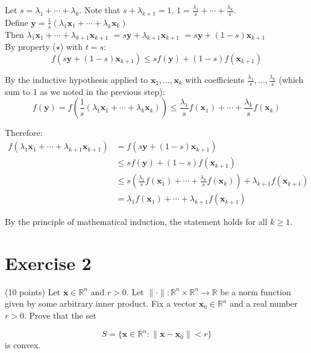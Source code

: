 \documentclass{article}
\begin{document}
Let $s = \lambda_1 + \cdots + \lambda_k$. Note that $s + \lambda_{k+1} = 1$, $1 = \frac{\lambda_1}{s} + \cdots + \frac{\lambda_{k}}{s}$. \\

Define $\mathbf{y} = \frac{1}{s}(\lambda_1\mathbf{x}_1 + \cdots + \lambda_k\mathbf{x}_k)$ \\

Then $\lambda_1\mathbf{x}_1 + \cdots + \lambda_{k+1}\mathbf{x}_{k+1}$ 
$= s\mathbf{y} + \lambda_{k+1}\mathbf{x}_{k+1}$
$= s\mathbf{y} + (1-s)\mathbf{x}_{k+1}$ \\

By property ($\star$) with $t = s$:
$$f(s\mathbf{y} + (1-s)\mathbf{x}_{k+1}) \leq sf(\mathbf{y}) + (1-s)f(\mathbf{x}_{k+1})$$

By the inductive hypothesis applied to $\mathbf{x}_1,\ldots,\mathbf{x}_k$ with coefficients $\frac{\lambda_1}{s},\ldots,\frac{\lambda_k}{s}$ (which sum to 1 as we noted in the previous step):
$$f(\mathbf{y}) = f(\frac{1}{s}(\lambda_1\mathbf{x}_1 + \cdots + \lambda_k\mathbf{x}_k)) \leq \frac{\lambda_1}{s}f(\mathbf{x}_1) + \cdots + \frac{\lambda_k}{s}f(\mathbf{x}_k)$$

Therefore:
\begin{align*}
f(\lambda_1\mathbf{x}_1 + \cdots + \lambda_{k+1}\mathbf{x}_{k+1}) &= f(s\mathbf{y} + (1-s)\mathbf{x}_{k+1}) \\
&\leq sf(\mathbf{y}) + (1-s)f(\mathbf{x}_{k+1}) \\
&\leq s(\frac{\lambda_1}{s}f(\mathbf{x}_1) + \cdots + \frac{\lambda_k}{s}f(\mathbf{x}_k)) + \lambda_{k+1}f(\mathbf{x}_{k+1}) \\
&= \lambda_1f(\mathbf{x}_1) + \cdots + \lambda_{k+1}f(\mathbf{x}_{k+1})
\end{align*}

By the principle of mathematical induction, the statement holds for all $k \geq 1$.

\newpage

\section*{Exercise 2}
(10 points) Let $\mathbf{x} \in \mathbb{R}^n$ and $r > 0$. Let $\|\cdot\|: \mathbb{R}^n \times \mathbb{R}^n \to \mathbb{R}$ be a norm function given by some arbitrary inner product. Fix a vector $\mathbf{x}_0 \in \mathbb{R}^n$ and a real number $r > 0$. Prove that the set

$$S = \{\mathbf{x} \in \mathbb{R}^n : \|\mathbf{x} - \mathbf{x}_0\| < r\}$$
is convex. \\
\end{document}
